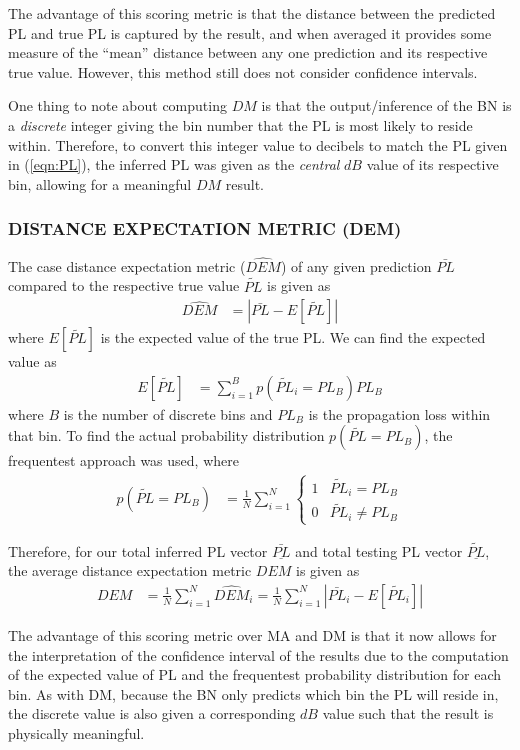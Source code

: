 \documentclass[12pt]{article}
\begin{document}
The advantage of this scoring metric is that the distance between the predicted PL and true PL is captured by the result, and when averaged it provides some measure of the ``mean'' distance between any one prediction and its respective true value. However, this method still does not consider confidence intervals.

One thing to note about computing $DM$ is that the output/inference of the BN is a \textit{discrete} integer giving the bin number that the PL is most likely to reside within. Therefore, to convert this integer value to decibels to match the PL given in (\ref{eqn:PL}), the inferred PL was given as the \textit{central} $dB$ value of its respective bin, allowing for a meaningful $DM$ result.

\subsubsection{DISTANCE EXPECTATION METRIC (DEM)}
The case distance expectation metric ($\hat{DEM}$) of any given prediction $\bar{PL}$ compared to the respective true value $\tilde{PL}$ is given as
\begin{align}
    \hat{DEM}&=|\bar{PL}-E[\tilde{PL}]|
\end{align}
where $E[\tilde{PL}]$ is the expected value of the true PL. We can find the expected value as
\begin{align}
    E[\tilde{PL}]&=\sum_{i=1}^Bp(\tilde{PL}_i=PL_B)PL_B
\end{align}
where $B$ is the number of discrete bins and $PL_B$ is the propagation loss within that bin. To find the actual probability distribution $p(\tilde{PL}=PL_B)$, the frequentest approach was used, where
\begin{align}
    p(\tilde{PL}=PL_B)&=\frac1N\sum_{i=1}^N\begin{cases}
        1 & \tilde{PL}_i=PL_B\\0 & \tilde{PL}_i\neq PL_B
    \end{cases}
\end{align}

Therefore, for our total inferred PL vector $\underline{\bar{PL}}$ and total testing PL vector $\underline{\tilde{PL}}$, the average distance expectation metric $DEM$ is given as
\begin{align}\label{eqn:DEM}
    DEM&=\frac1N\sum_{i=1}^N\hat{DEM}_i=\frac1N\sum_{i=1}^N|\bar{PL}_i-E[\tilde{PL}_i]|
\end{align}

The advantage of this scoring metric over MA and DM is that it now allows for the interpretation of the confidence interval of the results due to the computation of the expected value of PL and the frequentest probability distribution for each bin. As with DM, because the BN only predicts which bin the PL will reside in, the discrete value is also given a corresponding $dB$ value such that the result is physically meaningful.
\end{document}
